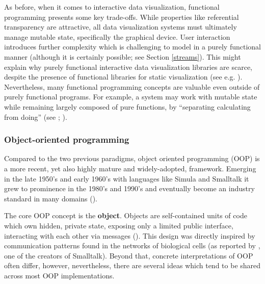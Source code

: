 \documentclass[
  openany]{book}
\theoremstyle{definition}
\theoremstyle{definition}
\theoremstyle{definition}
\theoremstyle{definition}
\theoremstyle{remark}
\begin{document}
As before, when it comes to interactive data visualization, functional programming presents some key trade-offs. While properties like referential transparency are attractive, all data visualization systems must ultimately manage mutable state, specifically the graphical device. User interaction introduces further complexity which is challenging to model in a purely functional manner (although it is certainly possible; see Section \ref{streams}). This might explain why purely functional interactive data visualization libraries are scarce, despite the presence of functional libraries for static visualization (see e.g. ). Nevertheless, many functional programming concepts are valuable even outside of purely functional programs. For example, a system may work with mutable state while remaining largely composed of pure functions, by ``separating calculating from doing'' (see ; ).

\subsubsection{Object-oriented programming}\label{oop}

Compared to the two previous paradigms, object oriented programming (OOP) is a more recent, yet also highly mature and widely-adopted, framework. Emerging in the late 1950's and early 1960's with languages like Simula and Smalltalk it grew to prominence in the 1980's and 1990's and eventually become an industry standard in many domains ().

The core OOP concept is the \textbf{object}. Objects are self-contained units of code which own hidden, private state, exposing only a limited public interface, interacting with each other via messages (). This design was directly inspired by communication patterns found in the networks of biological cells (as reported by , one of the creators of Smalltalk). Beyond that, concrete interpretations of OOP often differ, however, nevertheless, there are several ideas which tend to be shared across most OOP implementations.
\end{document}
